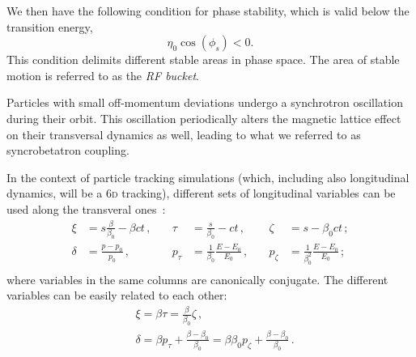 We then have the following condition for phase stability, which is valid below the transition energy,
\begin{equation}
    \eta_0 \cos \left(\phi_s\right)<0 .
\end{equation}
This condition delimits different stable areas in phase space. The area of stable motion is referred to as the \textit{RF bucket}. %

Particles with small off-momentum deviations undergo a synchrotron oscillation during their orbit. This oscillation periodically alters the magnetic lattice effect on their transversal dynamics as well, leading to what we referred to as syncrobetatron coupling.

In the context of particle tracking simulations (which, including also longitudinal dynamics, will be a 6\textsc{d} tracking), different sets of longitudinal variables can be used along the transveral ones~\cite{xsuite:physics}:
\begin{equation}
    \begin{aligned}
    \xi &= s \frac{\beta}{\beta_0}-\beta c t \,,\quad& \tau &= \frac{s}{\beta_0}-c t \,,\quad& \zeta &= s-\beta_0 c t \,;\\
    \delta &= \frac{p-p_0}{p_0} \,,\quad& p_\tau &= \frac{1}{\beta_0} \frac{E-E_0}{E_0} \,,\quad& p_\zeta &= \frac{1}{\beta_0^2} \frac{E-E_0}{E_0}\,; \\
    \end{aligned}
\end{equation}
where variables in the same columns are canonically conjugate.
The different variables can be easily related to each other:
\begin{equation}
    \begin{aligned}
    &\xi=\beta \tau=\frac{\beta}{\beta_0} \zeta \,,\\
    &\delta=\beta p_\tau+\frac{\beta-\beta_0}{\beta_0}=\beta \beta_0 p_\zeta+\frac{\beta-\beta_0}{\beta_0} \,.
    \end{aligned}
\end{equation}

\parseparator
